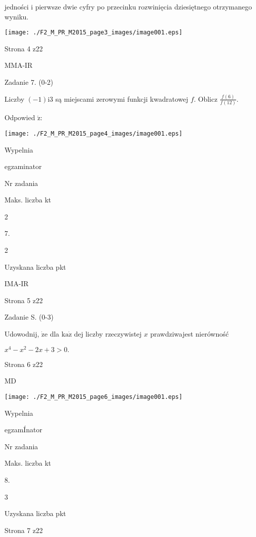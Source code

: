 \documentclass[a4paper,12pt]{article}
\begin{document}
jedności i pierwsze dwie cyfry po przecinku rozwinięcia dziesiętnego otrzymanego wyniku.
\begin{center}
\texttt{[image: ./F2\_M\_PR\_M2015\_page3\_images/image001.eps]}
\end{center}
Strona 4 z22

MMA-IR





Zadanie 7. (0-2)

Liczby $(-1) \mathrm{i}3$ są miejscami zerowymi funkcji kwadratowej $f$. Oblicz $\displaystyle \frac{f(6)}{f(12)}.$

Odpowied $\acute{\mathrm{z}}$:
\begin{center}
\texttt{[image: ./F2\_M\_PR\_M2015\_page4\_images/image001.eps]}
\end{center}
Wypelnia

egzaminator

Nr zadania

Maks. liczba kt

2

7.

2

Uzyskana liczba pkt

IMA-IR

Strona 5 z22





Zadanie S. (0-3)

Udowodnij, $\dot{\mathrm{z}}\mathrm{e}$ dla $\mathrm{k}\mathrm{a}\dot{\mathrm{z}}$ dej liczby rzeczywistej $x$ prawdziwajest nierówność

$x^{4}-x^{2}-2x+3>0.$

Strona 6 z22

MD




\begin{center}
\texttt{[image: ./F2\_M\_PR\_M2015\_page6\_images/image001.eps]}
\end{center}
Wypelnia

egzamÍnator

Nr zadania

Maks. liczba kt

8.

3

Uzyskana liczba pkt

Strona 7 z22
\end{document}
